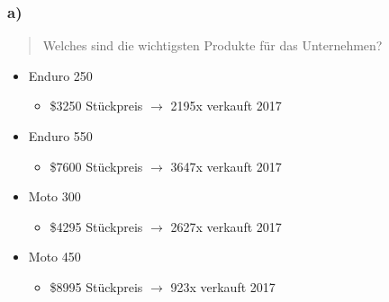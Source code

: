 \documentclass{beamer}
\begin{document}
\begin{frame}
\frametitle{a)}

\begin{quote}
Welches sind die wichtigsten Produkte für das Unternehmen?
\end{quote}

\begin{itemize}
\setlength{\itemsep}{14pt}

\item Enduro 250
\begin{itemize}
\item \$3250 St\"uckpreis $\rightarrow$ 2195x verkauft 2017
\end{itemize}

\item Enduro 550
\begin{itemize}
\item \$7600 St\"uckpreis $\rightarrow$ 3647x verkauft 2017
\end{itemize}

\item Moto 300
\begin{itemize}
\item \$4295 St\"uckpreis $\rightarrow$ 2627x verkauft 2017
\end{itemize}

\item Moto 450
\begin{itemize}
\item \$8995 St\"uckpreis $\rightarrow$ 923x verkauft 2017
\end{itemize}

\end{itemize}

\end{frame}
\end{document}
